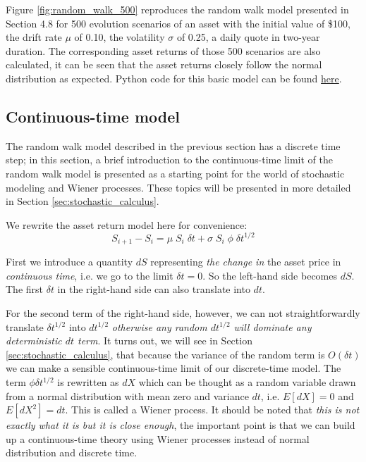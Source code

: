 Figure \ref{fig:random_walk_500} reproduces the random walk model presented in Section 4.8 \cite{pw_iqf2ed_2007} for 500 evolution scenarios of an asset with the initial value of \$100, the drift rate $\mu$ of 0.10, the volatility $\sigma$ of 0.25, a daily quote in two-year duration. The corresponding asset returns of those 500 scenarios are also calculated, it can be seen that the asset returns closely follow the normal distribution as expected. Python code for this basic model can be found \href{https://github.com/chitn/quantfin_study/blob/master/code/asset_modeling-random_walk.py}{here}.



\subsection{Continuous-time model}
The random walk model described in the previous section has a discrete time step; in this section, a brief introduction to the continuous-time limit of the random walk model is presented as a starting point for the world of stochastic modeling and Wiener processes. These topics will be presented in more detailed in Section \ref{sec:stochastic_calculus}.

We rewrite the asset return model here for convenience:
\begin{equation}
    S_{i+1} - S_i = \mu \; S_i \; \delta t + \sigma \; S_i \; \phi \; \delta t^{1/2}
\end{equation}

First we introduce a quantity $dS$ representing \textit{the change in} the asset price in \textit{continuous time}, i.e. we go to the limit $\delta t = 0$. So the left-hand side becomes $dS$. The first $\delta t$ in the right-hand side can also translate into $dt$. 

For the second term of the right-hand side, however, we can not straightforwardly translate $\delta t^{1/2}$ into $dt^{1/2}$ \textit{otherwise any random $dt^{1/2}$ will dominate any deterministic $dt$ term}. It turns out, we will see in Section \ref{sec:stochastic_calculus}, that because the variance of the random term is $O(\delta t)$ we can make a sensible continuous-time limit of our discrete-time model. The term $\phi \delta t^{1/2}$ is rewritten as $dX$ which can be thought as a random variable drawn from a normal distribution with mean zero and variance $dt$, i.e. $E[dX] = 0$ and $E[dX^2] = dt$. This is called a Wiener process. It should be noted that \textit{this is not exactly what it is but it is close enough}, the important point is that we can build up a continuous-time theory using Wiener processes instead of normal distribution and discrete time. 

